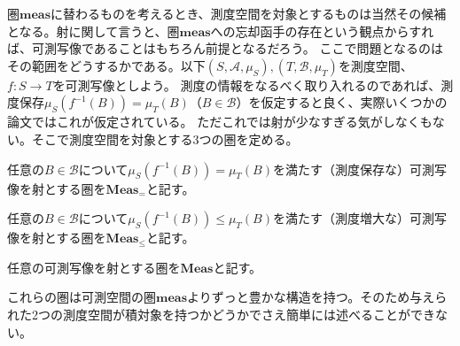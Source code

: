 \documentclass[../root.tex]{subfiles}
\begin{document}
圏$ \mathbf{meas} $に替わるものを考えるとき、測度空間を対象とするものは当然その候補となる。射に関して言うと、圏$ \mathbf{meas} $への忘却函手の存在という観点からすれば、可測写像であることはもちろん前提となるだろう。
ここで問題となるのはその範囲をどうするかである。以下$ ( S, \mathscr{A}, \mu_{S} ), ( T, \mathscr{B}, \mu_{T} ) $を測度空間、$ f\colon S\rightarrow T $を可測写像としよう。
測度の情報をなるべく取り入れるのであれば、測度保存$ \mu_{S}( f^{-1}( B ) )=\mu_{T}( B ) $（$ B\in\mathscr{B} $）を仮定すると良く、実際いくつかの論文ではこれが仮定されている。
ただこれでは射が少なすぎる気がしなくもない。そこで測度空間を対象とする3つの圏を定める。
\begin{EnumCond}
\item 任意の$ B\in\mathscr{B} $について$ \mu_{S}( f^{-1}( B ) )=\mu_{T}( B ) $を満たす（測度保存な）可測写像を射とする圏を$ \mathbf{Meas}_{=} $と記す。
\item 任意の$ B\in\mathscr{B} $について$ \mu_{S}( f^{-1}( B ) )\le\mu_{T}( B ) $を満たす（測度増大な）可測写像を射とする圏を$ \mathbf{Meas}_{\le} $と記す。
\item 任意の可測写像を射とする圏を$ \mathbf{Meas} $と記す。
\end{EnumCond}
これらの圏は可測空間の圏$ \mathbf{meas} $よりずっと豊かな構造を持つ。そのため与えられた2つの測度空間が積対象を持つかどうかでさえ簡単には述べることができない。
\end{document}
